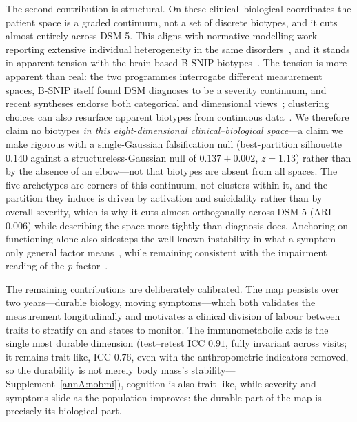 The second contribution is structural. On these clinical--biological coordinates the
patient space is a graded continuum, not a set of discrete biotypes, and it cuts
almost entirely across DSM-5. This aligns with normative-modelling work reporting
extensive individual heterogeneity in the same
disorders~\citep{wolfers2018,marquand2016,segal2023}, and it stands in apparent
tension with the brain-based B-SNIP biotypes~\citep{clementz2016biotypes,clementz2020}.
The tension is more apparent than real: the two programmes interrogate different
measurement spaces, B-SNIP itself found DSM diagnoses to be a severity continuum, and
recent syntheses endorse both categorical and dimensional
views~\citep{clementz2024}; clustering choices can also resurface apparent biotypes
from continuous data~\citep{pan2026}. We therefore claim no biotypes \emph{in this
eight-dimensional clinical--biological space}---a claim we make rigorous with a
single-Gaussian falsification null (best-partition silhouette $0.140$ against a
structureless-Gaussian null of $0.137 \pm 0.002$, $z = 1.13$) rather than by the
absence of an elbow---not that biotypes are absent from all spaces. The five
archetypes are corners of this continuum, not clusters within it, and the partition
they induce is driven by activation and suicidality rather than by overall severity,
which is why it cuts almost orthogonally across DSM-5 (ARI $0.006$) while describing
the space more tightly than diagnosis does. Anchoring \Gfac{} on functioning alone also
sidesteps the well-known instability in what a symptom-only general factor
means~\citep{heinrich2021bifactor,levinaspenson2020,watts2021}, while remaining
consistent with the impairment reading of the \textit{p}
factor~\citep{caspi2014pfactor,lahey2017general}.

The remaining contributions are deliberately calibrated. The map persists over two
years---durable biology, moving symptoms---which both validates the measurement
longitudinally and motivates a clinical division of labour between traits to stratify
on and states to monitor. The immunometabolic axis is the single most durable
dimension (test--retest ICC $0.91$, fully invariant across visits; it remains trait-like,
ICC $0.76$, even with the anthropometric indicators removed, so the durability is not merely
body mass's stability---Supplement~\ref{annA:nobmi}), cognition is also
trait-like, while severity and symptoms slide as the population improves: the durable
part of the map is precisely its biological part.

